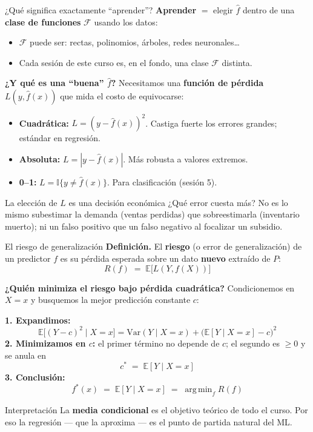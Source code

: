 \documentclass{beamer}
\newcommand{\E}{\mathbb{E}}
\newcommand{\Var}{\mathrm{Var}}
\newcommand{\1}{\mathbb{I}}
\DeclareMathOperator*{\argmin}{arg\,min}
\begin{document}
\begin{frame}{¿Qué significa exactamente ``aprender''?}
\small
\textbf{Aprender} $=$ elegir $\hat{f}$ dentro de una \textbf{clase de funciones} $\mathcal{F}$ usando los datos:
\begin{itemize}\itemsep3pt
  \item $\mathcal{F}$ puede ser: rectas, polinomios, árboles, redes neuronales\ldots
  \item Cada sesión de este curso es, en el fondo, una clase $\mathcal{F}$ distinta.
\end{itemize}
\pause

\vspace{0.2cm}
\textbf{¿Y qué es una ``buena'' $\hat{f}$?} Necesitamos una \textbf{función de pérdida} $L(y, \hat{f}(x))$ que mida el costo de equivocarse:
\begin{itemize}\itemsep4pt
  \item \textbf{Cuadrática:} $L = (y - \hat{f}(x))^2$. Castiga fuerte los errores grandes; estándar en regresión.
  \item \textbf{Absoluta:} $L = |y - \hat{f}(x)|$. Más robusta a valores extremos.
  \item \textbf{0--1:} $L = \1\{y \neq \hat{f}(x)\}$. Para clasificación (sesión 5).
\end{itemize}
\pause

\vspace{0.2cm}
\begin{block}{La elección de $L$ es una decisión económica}
¿Qué error cuesta más? No es lo mismo subestimar la demanda (ventas perdidas) que sobreestimarla (inventario muerto); ni un falso positivo que un falso negativo al focalizar un subsidio.
\end{block}
\end{frame}

\begin{frame}{El riesgo de generalización}
\small
\textbf{Definición.} El \textbf{riesgo} (o error de generalización) de un predictor $f$ es su pérdida esperada sobre un dato \textbf{nuevo} extraído de $P$:
\[ R(f) \;=\; \E\big[ L(Y, f(X)) \big] \]
\pause

\textbf{¿Quién minimiza el riesgo bajo pérdida cuadrática?} Condicionemos en $X = x$ y busquemos la mejor predicción constante $c$:
\vspace{0.1cm}

\textbf{1. Expandimos:}
\[ \E\big[(Y - c)^2 \mid X = x\big] = \Var(Y \mid X = x) + \big(\E[Y \mid X = x] - c\big)^2 \]
\pause
\textbf{2. Minimizamos en $c$:} el primer término no depende de $c$; el segundo es $\geq 0$ y se anula en
\[ c^\ast \;=\; \E[Y \mid X = x] \]
\pause
\textbf{3. Conclusión:}
\[ f^\ast(x) \;=\; \E[Y \mid X = x] \;=\; \argmin_{f} R(f) \]
\pause
\begin{block}{Interpretación}
La \textbf{media condicional} es el objetivo teórico de todo el curso. Por eso la regresión --- que la aproxima --- es el punto de partida natural del ML.
\end{block}
\end{frame}
\end{document}
